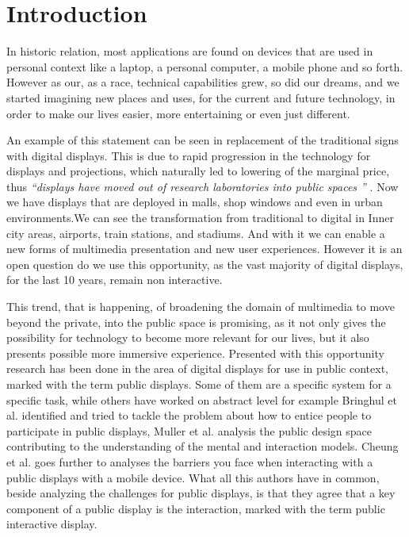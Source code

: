 \section{Introduction}
In historic relation, most applications are found on devices that are used in personal context like a laptop, a personal computer, a mobile phone and so forth. However as our, as a race, technical capabilities grew, so did our dreams, and we started imagining new places and uses, for the current and future technology, in order to make our lives easier, more entertaining or even just different. 

An example of this statement can be seen in replacement of the traditional signs with digital displays. This is due to rapid progression in the technology for displays and projections, which naturally led to lowering of the marginal price, thus \emph{``displays have moved out of research laboratories into public spaces ''} \cite{Hinrichs:2013:IPD:2478559.2478965}. Now we have displays that are deployed in malls, shop windows and even in urban environments.We can see the transformation from traditional to digital in Inner city areas, airports, train stations, and stadiums. And with it we can enable a new forms of multimedia presentation and new user experiences. However it is an open question do we use this opportunity, as the vast majority of digital displays, for the last 10 years, remain non interactive.

This trend, that is happening, of broadening the domain of multimedia to move beyond the private, into the public space is promising, as it not only gives the possibility for technology to become more relevant for our lives, but it also presents possible more immersive experience. Presented with this opportunity research has been done in the area of digital displays for use in  public context, marked with the term public displays. Some of them are a specific system for a specific task, while others have worked on abstract level for example Bringhul et al.\cite{Brignull:2003} identified and tried to tackle the problem about how to entice people to participate in public displays, Muller et al.\cite{Muller:2010} analysis the public design space contributing to the understanding of the mental and interaction models. Cheung et al. \cite{Cheung:2014} goes further to analyses the barriers you face when interacting with a public displays with a mobile device.  What all this authors have in common, beside analyzing the challenges for public displays, is that they agree that a key component of a public display is the interaction, marked with the term public interactive display.

